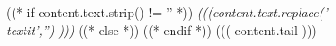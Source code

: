 ((* if content.text.strip() != '' *)) \emph{(((content.text.replace('\\textit','')-)))} ((* else *))
((* endif *))
 (((-content.tail-)))
